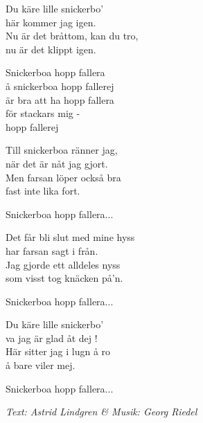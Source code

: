 \vspace{10pt}
Du käre lille snickerbo'\\
här kommer jag igen.\\
Nu är det bråttom, kan du tro,\\
nu är det klippt igen.\par
\vspace{6pt}
Snickerboa hopp fallera\\
å snickerboa hopp fallerej\\
är bra att ha hopp fallera\\
för stackars mig -\\
hopp fallerej\par
\vspace{6pt}
Till snickerboa ränner jag,\\
när det är nåt jag gjort.\\
Men farsan löper också bra\\
fast inte lika fort.\par
\vspace{6pt}
Snickerboa hopp fallera...\par
\vspace{6pt}
Det får bli slut med mine hyss\\
har farsan sagt i från.\\
Jag gjorde ett alldeles nyss\\
som visst tog knäcken på'n.\par
\vspace{6pt}
Snickerboa hopp fallera...\par
\vspace{6pt}
Du käre lille snickerbo'\\
va jag är glad åt dej !\\
Här sitter jag i lugn å ro\\
å bare viler mej.\par
\vspace{6pt}
Snickerboa hopp fallera...\par
\vspace{10pt}
{\footnotesize\textit{Text: Astrid Lindgren \& Musik: Georg Riedel}}
